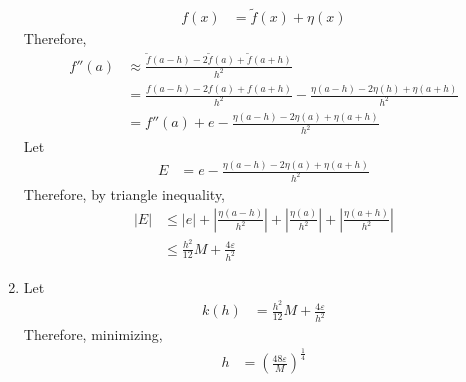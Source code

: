 \documentclass[fleqn, a4paper, 12pt, twoside]{article}
\theoremstyle{definition}
\theoremstyle{theorem}
\renewcommand{\tilde}{\widetilde}
\begin{document}
\begin{solution}
\begin{enumerate}[leftmargin=*]
\begin{align*}
				f(x) & = \tilde{f}(x) + \eta(x)
			\end{align*}
			Therefore,
			\begin{align*}
				f''(a) & \approx \frac{\tilde{f}(a - h) - 2 \tilde{f}(a) + \tilde{f}(a + h)}{h^2}                       \\
                                       & = \frac{f(a - h) - 2 f(a) + f(a + h)}{h^2} - \frac{\eta(a - h) - 2 \eta(h) + \eta(a + h)}{h^2} \\
                                       & = f''(a) + e - \frac{\eta(a - h) - 2 \eta(a) + \eta(a + h)}{h^2}
			\end{align*}
			Let
			\begin{align*}
				E & = e - \frac{\eta(a - h) - 2 \eta(a) + \eta(a + h)}{h^2}
			\end{align*}
			Therefore, by triangle inequality,
			\begin{align*}
				|E| & \le |e| + \left| \frac{\eta(a - h)}{h^2} \right| + \left| \frac{\eta(a)}{h^2} \right| + \left| \frac{\eta(a + h)}{h^2} \right| \\
                                    & \le \frac{h^2}{12} M + \frac{4 \varepsilon}{h^2}
			\end{align*}
		\item
			Let
			\begin{align*}
				k(h) & = \frac{h^2}{12} M + \frac{4 \varepsilon}{h^2}
			\end{align*}
			Therefore, minimizing,
			\begin{align*}
				h & = \left( \frac{48 \varepsilon}{M} \right)^{\frac{1}{4}}
			\end{align*}
	\end{enumerate}
\end{solution}
\end{document}
